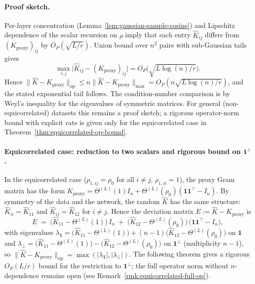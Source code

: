 \paragraph{Proof sketch.} Per-layer concentration (Lemma~\ref{lem:gaussian-sample-cosine}) and Lipschitz dependence of the scalar recursion on \(\rho\) imply that each entry \(\hat{K}_{ij}\) differs from \((K_{\mathrm{proxy}})_{ij}\) by \(O_P(\sqrt{L/r})\). Union bound over \(n^2\) pairs with sub-Gaussian tails gives
\[
\max_{i,j}\bigl|\hat{K}_{ij}-(K_{\mathrm{proxy}})_{ij}\bigr|=O_P\bigl(\sqrt{L\log(n)/r}\bigr).
\]
Hence \(\|\hat{K}-K_{\mathrm{proxy}}\|_{\mathrm{op}}\le n\|\hat{K}-K_{\mathrm{proxy}}\|_{\max}=O_P(n\sqrt{L\log(n)/r})\), and the stated exponential tail follows. The condition-number comparison is by Weyl's inequality for the eigenvalues of symmetric matrices. For general (non-equicorrelated) datasets this remains a proof sketch; a rigorous operator-norm bound with explicit rate is given only for the equicorrelated case in Theorem~\ref{thm:equicorrelated-op-bound}.

\paragraph{Equicorrelated case: reduction to two scalars and rigorous bound on \(\mathbf{1}^\perp\).}
In the equicorrelated case (\(\rho_{1,ij}=\rho_0\) for all \(i\neq j\), \(\rho_{1,ii}=1\)), the proxy Gram matrix has the form \(K_{\mathrm{proxy}}=\Theta^{(L)}(1)I_n+\Theta^{(L)}(\rho_0)(\mathbf{1}\mathbf{1}^\top-I_n)\). By symmetry of the data and the network, the random \(\hat{K}\) has the same structure: \(\hat{K}_{ii}=\hat{K}_{11}\) and \(\hat{K}_{ij}=\hat{K}_{12}\) for \(i\neq j\). Hence the deviation matrix \(E\mathrel{:=}\hat{K}-K_{\mathrm{proxy}}\) is
\[
E \;=\; \bigl(\hat{K}_{11}-\Theta^{(L)}(1)\bigr)\,I_n \;+\; \bigl(\hat{K}_{12}-\Theta^{(L)}(\rho_0)\bigr)\,\bigl(\mathbf{1}\mathbf{1}^\top-I_n\bigr),
\]
with eigenvalues \(\lambda_{\mathbf{1}}=\bigl(\hat{K}_{11}-\Theta^{(L)}(1)\bigr)+(n-1)\bigl(\hat{K}_{12}-\Theta^{(L)}(\rho_0)\bigr)\) on \(\mathbf{1}\) and \(\lambda_\perp=\bigl(\hat{K}_{11}-\Theta^{(L)}(1)\bigr)-\bigl(\hat{K}_{12}-\Theta^{(L)}(\rho_0)\bigr)\) on \(\mathbf{1}^\perp\) (multiplicity \(n-1\)), so \(\|\hat{K}-K_{\mathrm{proxy}}\|_{\mathrm{op}}=\max(|\lambda_{\mathbf{1}}|,|\lambda_\perp|)\). The following theorem gives a rigorous \(O_P(L/r)\) bound for the restriction to \(\mathbf{1}^\perp\); the full operator norm without \(n\)-dependence remains open (see Remark~\ref{rmk:equicorrelated-full-op}).

